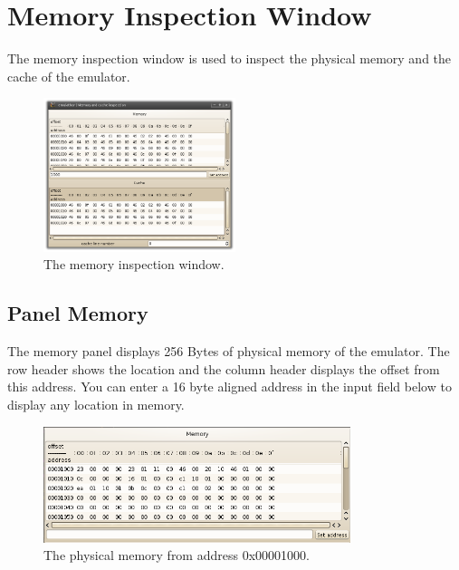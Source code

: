 \section{Memory Inspection Window}
The memory inspection window is used to inspect the physical memory and the cache of the emulator.

\begin{figure}[H]
\begin{center}
	\includegraphics[width=0.5\textwidth]{./files/emu_gui_mem.png}
\end{center}
	\caption{The memory inspection window.}
\end{figure}

\subsection{Panel Memory}
The memory panel displays 256 Bytes of physical memory of the emulator. The row header shows the location and the column header displays the offset from this address. You can enter a 16 byte aligned address in the input field below to display any location in memory.
\begin{figure}[H]
\begin{center}
	\includegraphics[width=0.8\textwidth]{./files/emu_gui_mem_memory.png}
\end{center}
	\caption{The physical memory from address 0x00001000.}
\end{figure}

